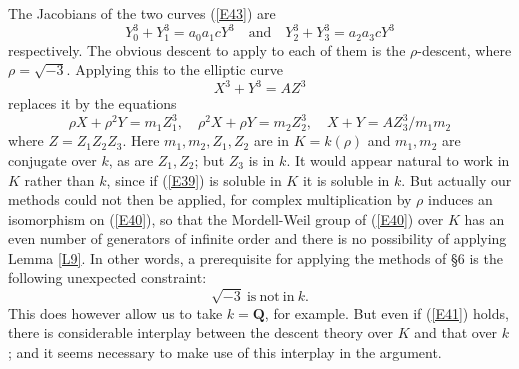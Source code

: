 \documentclass[12pt]{article}
\def\bQ{{\mathbf Q}}
\def\beq{\begin{equation} \label}
\begin{document}
The Jacobians of the two curves (\ref{E43}) are
\beq{E42} Y_0^3+Y_1^3=a_0a_1cY^3 \quad {\mathrm{and}} \quad
Y_2^3+Y_3^3=a_2a_3cY^3 \end{equation}
respectively. The obvious descent to apply to each of them is the
$\rho$-descent, where $\rho=\sqrt{-3}$. Applying this to the elliptic curve
\beq{E40} X^3+Y^3=AZ^3 \end{equation}
replaces it by the equations
\[ \rho X+\rho^2Y=m_1Z_1^3, \quad \rho^2X+\rho Y=m_2Z_2^3, \quad
X+Y=AZ_3^3/m_1m_2 \]
where $Z=Z_1Z_2Z_3$. Here $m_1,m_2,Z_1,Z_2$ are in $K=k(\rho)$ and $m_1,m_2$
are conjugate over $k$, as are $Z_1,Z_2$; but $Z_3$ is in
$k$. It would appear natural to work in
$K$ rather than $k$, since if (\ref{E39}) is soluble in $K$ it is soluble in
$k$. But actually our methods could not then be applied, for complex
multiplication by $\rho$ induces an isomorphism on (\ref{E40}), so that the
Mordell-Weil group of (\ref{E40}) over $K$ has an even number of generators
of infinite order and there is no possibility of applying Lemma \ref{L9}. In
other words, a prerequisite for applying the methods of \S6 is the following
unexpected constraint:
\beq{E41} \sqrt{-3} {\mathrm{~is~not~in~}} k. \end{equation}
This does however allow us to take $k=\bQ$, for example. But even if
(\ref{E41}) holds, there is considerable interplay between the descent theory
over $K$ and that over $k$; and it seems necessary to make use of this
interplay in the argument.
\end{document}
